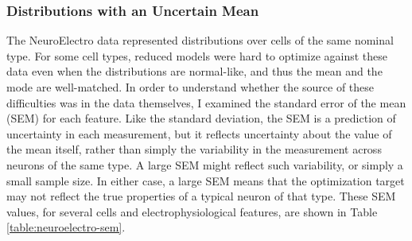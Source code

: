 \subsubsection{Distributions with an Uncertain Mean}
The NeuroElectro data represented distributions over cells of the same nominal type.
For some cell types, reduced models were hard to optimize against these data even when the distributions are normal-like, and thus the mean and the mode are well-matched.
In order to understand whether the source of these difficulties was in the data themselves, I examined the standard error of the mean (SEM) for each feature.
Like the standard deviation, the SEM is a prediction of uncertainty in each measurement, but it reflects uncertainty about the value of the mean itself, rather than simply the variability in the measurement across neurons of the same type.
A large SEM might reflect such variability, or simply a small sample size. 
In either case, a large SEM means that the optimization target may not reflect the true properties of a typical neuron of that type.
These SEM values, for several cells and electrophysiological features, are shown in Table \ref{table:neuroelectro-sem}.

\begin{table}
\caption[Standard Error of the Mean across NeuroElectro Data Sources]{The standard error of the mean (SEM) described the uncertainty that the sample mean value of a feature (across neurons) is close to the population mean.
The SEM values describe that uncertainty for the sample means of various features for each of 4 cell types in NeuroElectro.}
\label{table:neuroelectro-sem}
\end{table}

